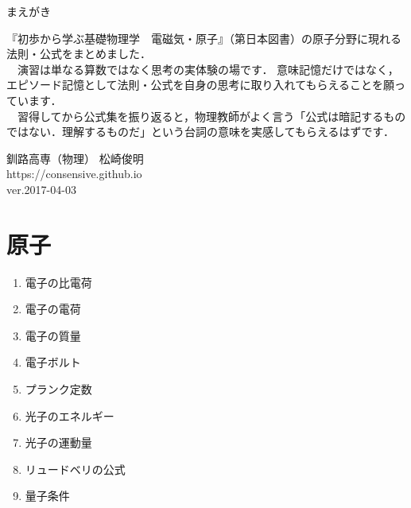 \documentclass[10pt]{jarticle}
\begin{document}
\addtocounter{page}{-1}
\thispagestyle{empty}

まえがき\\

{\scriptsize
『初歩から学ぶ基礎物理学　電磁気・原子』（第日本図書）の原子分野に現れる法則・公式をまとめました．\\

　演習は単なる算数ではなく思考の実体験の場です．
意味記憶だけではなく，エピソード記憶として法則・公式を自身の思考に取り入れてもらえることを願っています．\\

　習得してから公式集を振り返ると，物理教師がよく言う「公式は暗記するものではない．理解するものだ」という台詞の意味を実感してもらえるはずです．




\vfill
\hfill 釧路高専（物理） 松崎俊明\\
\hfill https://consensive.github.io\\

\vskip-3mm \hfill ver.2017-04-03\\
}






\newpage
\addtocounter{page}{-1}
\thispagestyle{empty}
\section{原子}

\begin{enumerate}
\small
\itemsep-4mm
\item 電子の比電荷 \\
\item 電子の電荷 \\
\item 電子の質量 \\
\item 電子ボルト \\
\item プランク定数 \\
\item 光子のエネルギー \\
\item 光子の運動量 \\
\item リュードベリの公式 \\
\item 量子条件 \\
\end{enumerate}
\end{document}
